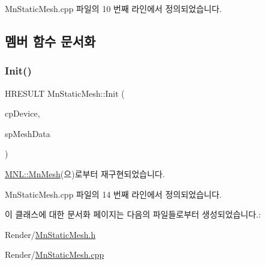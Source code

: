 Mn\+Static\+Mesh.\+cpp 파일의 10 번째 라인에서 정의되었습니다.



\subsection{멤버 함수 문서화}
\mbox{\label{class_m_n_l_1_1_mn_static_mesh_a0593293ce8d641b9573239828b8dc31b}} 
\subsubsection{\texorpdfstring{Init()}{Init()}}
{\footnotesize\ttfamily H\+R\+E\+S\+U\+LT Mn\+Static\+Mesh\+::\+Init (\begin{DoxyParamCaption}\item[{const \hyperlink{namespace_m_n_l_a1eec210db8f309a4a9ac0d9658784c31}{C\+P\+D3\+D\+Device} \&}]{cp\+Device,  }\item[{const std\+::shared\+\_\+ptr$<$ \hyperlink{class_m_n_l_1_1_mn_mesh_data}{Mn\+Mesh\+Data} $>$}]{sp\+Mesh\+Data }\end{DoxyParamCaption})\hspace{0.3cm}{\ttfamily [virtual]}}



\hyperlink{class_m_n_l_1_1_mn_mesh_a694b6dfe0ae3ed0f97bcf055525b8659}{M\+N\+L\+::\+Mn\+Mesh}(으)로부터 재구현되었습니다.



Mn\+Static\+Mesh.\+cpp 파일의 14 번째 라인에서 정의되었습니다.



이 클래스에 대한 문서화 페이지는 다음의 파일들로부터 생성되었습니다.\+:\begin{DoxyCompactItemize}
\item 
Render/\hyperlink{_mn_static_mesh_8h}{Mn\+Static\+Mesh.\+h}\item 
Render/\hyperlink{_mn_static_mesh_8cpp}{Mn\+Static\+Mesh.\+cpp}\end{DoxyCompactItemize}
